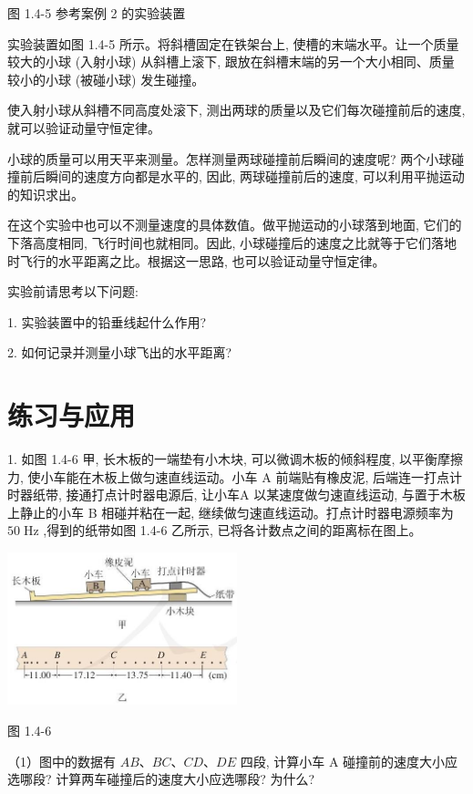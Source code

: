 \documentclass[10pt]{article}
\begin{document}
图 1.4-5 参考案例 2 的实验装置

实验装置如图 1.4-5 所示。将斜槽固定在铁架台上, 使槽的末端水平。让一个质量较大的小球 (入射小球) 从斜槽上滚下, 跟放在斜槽末端的另一个大小相同、质量较小的小球 (被碰小球) 发生碰撞。

使入射小球从斜槽不同高度处滚下, 测出两球的质量以及它们每次碰撞前后的速度, 就可以验证动量守恒定律。

小球的质量可以用天平来测量。怎样测量两球碰撞前后瞬间的速度呢? 两个小球碰撞前后瞬间的速度方向都是水平的, 因此, 两球碰撞前后的速度, 可以利用平抛运动的知识求出。

在这个实验中也可以不测量速度的具体数值。做平抛运动的小球落到地面, 它们的下落高度相同, 飞行时间也就相同。因此, 小球碰撞后的速度之比就等于它们落地时飞行的水平距离之比。根据这一思路, 也可以验证动量守恒定律。

实验前请思考以下问题:

1. 实验装置中的铅垂线起什么作用?

2. 如何记录并测量小球飞出的水平距离?

\section*{练习与应用}

1. 如图 1.4-6 甲, 长木板的一端垫有小木块, 可以微调木板的倾斜程度, 以平衡摩擦力, 使小车能在木板上做匀速直线运动。小车 A 前端贴有橡皮泥, 后端连一打点计时器纸带, 接通打点计时器电源后, 让小车A 以某速度做匀速直线运动, 与置于木板上静止的小车 B 相碰并粘在一起, 继续做匀速直线运动。打点计时器电源频率为 \({50}\mathrm{\;{Hz}}\) ,得到的纸带如图 1.4-6 乙所示, 已将各计数点之间的距离标在图上。

\begin{center}
\includegraphics[max width=0.5\textwidth]{images/01910e4c-ebb8-7d2c-8f2f-2375bc1d2d12_25_390290.jpg}
\end{center}

图 1.4-6

（1）图中的数据有 \({AB}\text{、}{BC}\text{、}{CD}\text{、}{DE}\) 四段, 计算小车 A 碰撞前的速度大小应选哪段? 计算两车碰撞后的速度大小应选哪段? 为什么?
\end{document}
